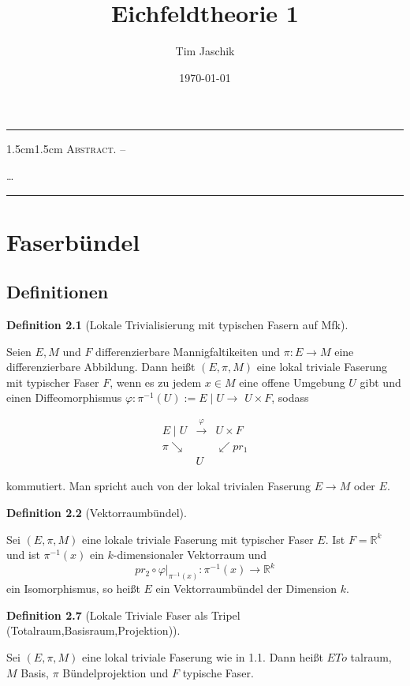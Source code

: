 \documentclass[10pt, letterpaper]{article}
\title{Eichfeldtheorie 1}
\author{Tim Jaschik}
\date{\today}
\renewenvironment{abstract}
  {
    \begin{adjustwidth}{1.5cm}{1.5cm}
    \small
    \textsc{Abstract. –}%
  }
  {
    \end{adjustwidth}
  }
\newcommand{\CustomHeading}[3]{%
  \par\medskip\noindent%
  \textbf{#1 #2} \textnormal{(#3)}.\enskip%
}
\newenvironment{DEF}[2]{\CustomHeading{Definition}{#1}{#2}}{}
\begin{document}
\maketitle
\rule{\textwidth}{0.5pt}
\begin{abstract}
…
\end{abstract}
\rule{\textwidth}{0.5pt}
\vspace{0.5cm}

\tableofcontents


\pagebreak


\section{Faserbündel}

\subsection{Definitionen}

\begin{DEF}{2.1}{Lokale Trivialisierung mit typischen Fasern auf Mfk}
    Seien $E, M$ und $F$ differenzierbare Mannigfaltikeiten und $\pi: E \rightarrow M$ eine differenzierbare Abbildung. Dann heißt $(E, \pi, M)$ eine lokal triviale Faserung mit typischer Faser $F$, wenn es zu jedem $x \in M$ eine offene Umgebung $U$ gibt und einen Diffeomorphismus $\varphi: \pi^{-1}(U):=E \mid U \rightarrow$ $U \times F$, sodass

    $$
    \begin{array}{lll}
    E \mid U & \xrightarrow{\varphi} & U \times F \\
    \pi \searrow & & \swarrow p r_1 \\
    & U &
    \end{array}
    $$
    
    kommutiert. Man spricht auch von der lokal trivialen Faserung $E \rightarrow M$ oder $E$.
\end{DEF}


\begin{DEF}{2.2}{Vektorraumbündel}
    Sei $(E,\pi,M)$ eine lokale triviale Faserung mit typischer Faser $E$. Ist $F=\mathbb{R}^k$ und ist $\pi^{-1}(x)$ ein $k$-dimensionaler Vektorraum und 
    $$p r_2 \circ \left.\varphi\right|_{\pi^{-1}(x)}: \pi^{-1}(x) \rightarrow \mathbb{R}^k$$ 
    ein Isomorphismus, so heißt $E$ ein Vektorraumbündel der Dimension $k$.
\end{DEF}


\begin{DEF}{2.7}{Lokale Triviale Faser als Tripel (Totalraum,Basisraum,Projektion)}
    Sei $(E, \pi, M)$ eine lokal triviale Faserung wie in 1.1. Dann heißt $E T o$ talraum, $M$ Basis, $\pi$ Bündelprojektion und $F$ typische Faser.
\end{DEF}
\end{document}

